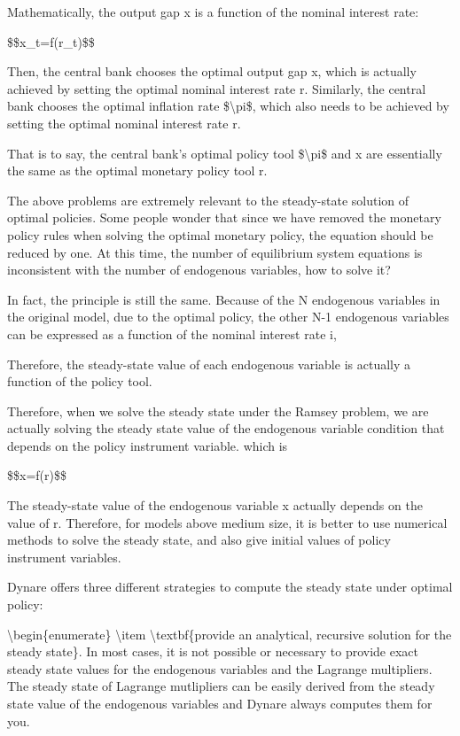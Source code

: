\documentclass[10pt,math=newtx,citestyle=gb7714-2015,bibstyle=gb7714-2015]{elegantbook}
\begin{document}
	Mathematically, the output gap x is a function of the nominal interest rate:
	
	\$\$x\_t=f(r\_t)\$\$
	
	Then, the central bank chooses the optimal output gap x, which is actually achieved by setting the optimal nominal interest rate r. Similarly, the central bank chooses the optimal inflation rate \$\textbackslash{}pi\$, which also needs to be achieved by setting the optimal nominal interest rate r.
	
	That is to say, the central bank's optimal policy tool \$\textbackslash{}pi\$ and x are essentially the same as the optimal monetary policy tool r.
	
	The above problems are extremely relevant to the steady-state solution of optimal policies. Some people wonder that since we have removed the monetary policy rules when solving the optimal monetary policy, the equation should be reduced by one. At this time, the number of equilibrium system equations is inconsistent with the number of endogenous variables, how to solve it?
	
	In fact, the principle is still the same. Because of the N endogenous variables in the original model, due to the optimal policy, the other N-1 endogenous variables can be expressed as a function of the nominal interest rate i,
	
	Therefore, the steady-state value of each endogenous variable is actually a function of the policy tool.
	
	Therefore, when we solve the steady state under the Ramsey problem, we are actually solving the steady state value of the endogenous variable condition that depends on the policy instrument variable. which is
	
	\$\$x=f(r)\$\$
	
	The steady-state value of the endogenous variable x actually depends on the value of r. Therefore, for models above medium size, it is better to use numerical methods to solve the steady state, and also give initial values ​​of policy instrument variables.
	
	Dynare offers three different strategies to compute the steady state under optimal policy:
	
	\textbackslash{}begin\{enumerate\}
	\textbackslash{}item \textbackslash{}textbf\{provide an analytical, recursive solution for the steady state\}. In most cases, it is not possible or necessary to provide exact steady state values for the endogenous variables and the Lagrange multipliers. The steady state of Lagrange mutlipliers can be easily derived from the steady state value of the endogenous variables and Dynare always computes them for you.
	
\end{document}
